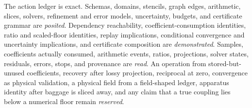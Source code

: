 The action ledger is exact.  Schemas, domains, stencils, graph edges, arithmetic, slices, solvers, refinement and error
models, uncertainty, budgets, and certificate grammar are \emph{posited}.  Dependency reachability,
coefficient-consumption identities, ratio and scaled-floor identities, replay implications, conditional convergence
and uncertainty implications, and certificate composition are \emph{demonstrated}.  Samples, coefficients actually
consumed, arithmetic events, ratios, projections, solver states, residuals, errors, stops, and provenance are
\emph{read}.  An operation from stored-but-unused coefficients, recovery after lossy projection, reciprocal at zero,
convergence as physical validation, a physical field from a field-shaped ledger, apparatus identity after baggage is
sliced away, and any claim that a true coupling lies below a numerical floor remain \emph{reserved}.
